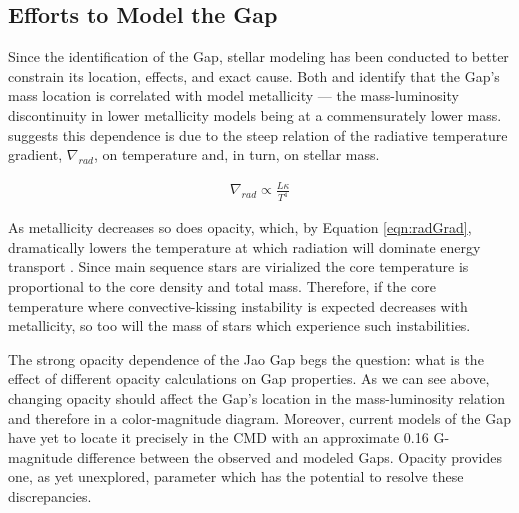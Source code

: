 \subsection{Efforts to Model the Gap}
Since the identification of the Gap, stellar modeling has been
conducted to better constrain its location, effects, and exact cause.
Both \citet{Mansfield2021} and \citet{Feiden2021} identify that the Gap's mass
location is correlated with model metallicity --- the mass-luminosity
discontinuity in lower metallicity models being at a commensurately lower mass.
\citet{Feiden2021} suggests this dependence is due to the steep relation of
the radiative temperature gradient, $\nabla_{rad}$, on temperature and, in turn,
on stellar mass.

\begin{align}\label{eqn:radGrad}
	\nabla_{rad} \propto \frac{L\kappa}{T^{4}}
\end{align}

As metallicity decreases so does opacity, which, by Equation \ref{eqn:radGrad},
dramatically lowers the temperature at which radiation will dominate energy
transport \citep{Chabrier1997}. Since main sequence stars are virialized the
core temperature is proportional to the core density and total mass. Therefore,
if the core temperature where convective-kissing instability is expected
decreases with metallicity, so too will the mass of stars which experience such
instabilities.


The strong opacity dependence of the Jao Gap begs the question: what is
the effect of different opacity calculations on Gap properties.
As we can see above, changing opacity should affect the Gap's location in the
mass-luminosity relation and therefore in a color-magnitude diagram. Moreover,
current models of the Gap have yet to locate it precisely in the CMD
\citep{Feiden2021} with an approximate 0.16 G-magnitude difference between the
observed and modeled Gaps. Opacity provides one, as yet unexplored, parameter
which has the potential to resolve these discrepancies.
